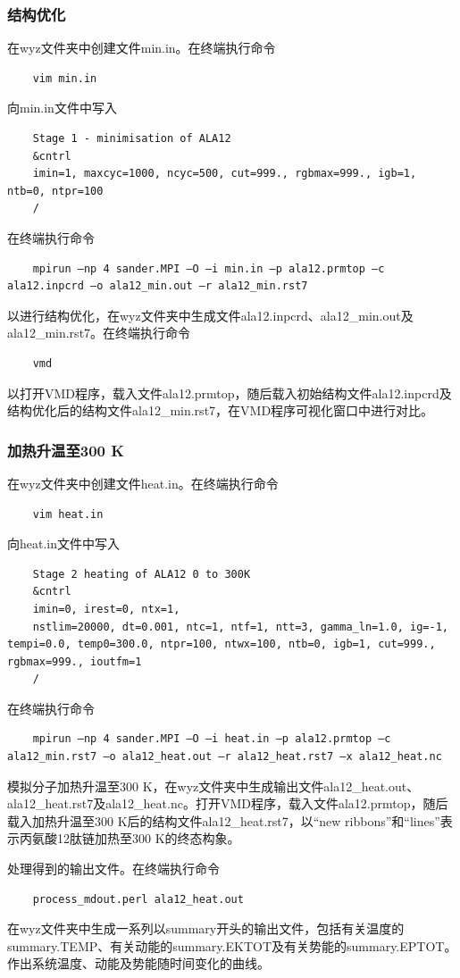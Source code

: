 \documentclass[12pt]{article}
\begin{document}
	
			\subsubsection{结构优化}
		在wyz文件夹中创建文件min.in。在终端执行命令
		\begin{lstlisting}
	vim min.in
		\end{lstlisting}
		向min.in文件中写入
		\begin{lstlisting}
	Stage 1 - minimisation of ALA12
	&cntrl
	imin=1, maxcyc=1000, ncyc=500, cut=999., rgbmax=999., igb=1, ntb=0, ntpr=100
	/
		\end{lstlisting}
		在终端执行命令
\begin{lstlisting}
	mpirun –np 4 sander.MPI –O –i min.in –p ala12.prmtop –c ala12.inpcrd –o ala12_min.out –r ala12_min.rst7
\end{lstlisting}
	以进行结构优化，在wyz文件夹中生成文件ala12.inpcrd、ala12\_min.out及ala12\_min.rst7。在终端执行命令
\begin{lstlisting}
	vmd
\end{lstlisting}
	以打开VMD程序，载入文件ala12.prmtop，随后载入初始结构文件ala12.inpcrd及结构优化后的结构文件ala12\_min.rst7，在VMD程序可视化窗口中进行对比。
	
	
	
			\subsubsection{加热升温至300 K}
			在wyz文件夹中创建文件heat.in。在终端执行命令
	\begin{lstlisting}
	vim heat.in
\end{lstlisting}
向heat.in文件中写入
\begin{lstlisting}
	Stage 2 heating of ALA12 0 to 300K
	&cntrl
	imin=0, irest=0, ntx=1,
	nstlim=20000, dt=0.001, ntc=1, ntf=1, ntt=3, gamma_ln=1.0, ig=-1, tempi=0.0, temp0=300.0, ntpr=100, ntwx=100, ntb=0, igb=1, cut=999., rgbmax=999., ioutfm=1
	/
\end{lstlisting}
在终端执行命令
\begin{lstlisting}
	mpirun –np 4 sander.MPI –O –i heat.in –p ala12.prmtop –c ala12_min.rst7 –o ala12_heat.out –r ala12_heat.rst7 –x ala12_heat.nc
\end{lstlisting}
模拟分子加热升温至300 K，在wyz文件夹中生成输出文件ala12\_heat.out、ala12\_heat.rst7及ala12\_heat.nc。打开VMD程序，载入文件ala12.prmtop，随后载入加热升温至300 K后的结构文件ala12\_heat.rst7，以“new ribbons”和“lines”表示丙氨酸12肽链加热至300 K的终态构象。\par
处理得到的输出文件。在终端执行命令
\begin{lstlisting}
	process_mdout.perl ala12_heat.out
\end{lstlisting}
在wyz文件夹中生成一系列以summary开头的输出文件，包括有关温度的summary.TEMP、有关动能的summary.EKTOT及有关势能的summary.EPTOT。作出系统温度、动能及势能随时间变化的曲线。
\end{document}
